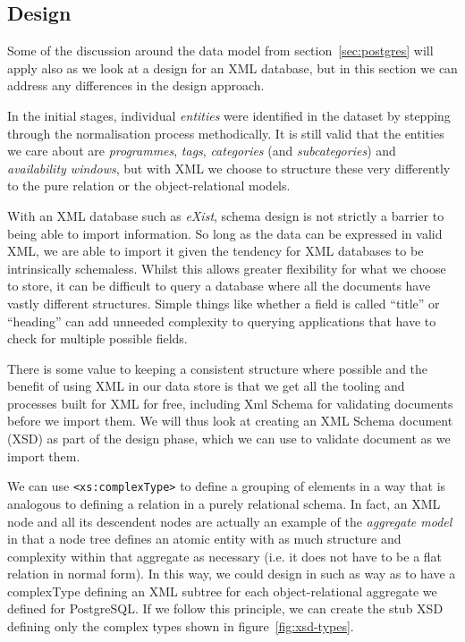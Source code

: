 \documentclass[11pt,a4paper]{article}
\begin{document}
\subsection{Design}

Some of the discussion around the data model from section~\ref{sec:postgres}
will apply also as we look at a design for an XML database, but
in this section we can address any differences in the design approach.

In the initial stages, individual \emph{entities} were identified in the
dataset by stepping through the normalisation process methodically. It
is still valid that the entities we care about are \emph{programmes},
\emph{tags}, \emph{categories} (and \emph{subcategories}) and
\emph{availability windows}, but with XML we choose to structure these
very differently to the pure relation or the object-relational models.

With an XML database such as \emph{eXist}, schema design is not strictly
a barrier to being able to import information. So long as the data can
be expressed in valid XML, we are able to import it given the tendency
for XML databases to be intrinsically schemaless. Whilst this allows
greater flexibility for what we choose to store, it can be difficult
to query a database where all the documents have vastly different structures.
Simple things like whether a field is called ``title'' or ``heading''
can add unneeded complexity to querying applications that have to check
for multiple possible fields.

There is some value to keeping a consistent structure where possible
and the benefit of using XML in our data store is that we get all
the tooling and processes built for XML for free, including Xml Schema for
validating documents before we import them. We will thus look at creating
an XML Schema document (XSD) as part of the design phase, which we can
use to validate document as we import them.

We can use \lstinline|<xs:complexType>| to define a grouping of elements
in a way that is analogous to defining a relation in a purely relational
schema. In fact, an XML node and all its descendent nodes are actually an
example of the \emph{aggregate model} in that a node tree defines an
atomic entity with as much structure and complexity within that
aggregate as necessary (i.e. it does not have to be a flat relation in
normal form). In this way, we could design in such as way as to have
a complexType defining an XML subtree for each object-relational aggregate
we defined for PostgreSQL. If we follow this principle, we can create
the stub XSD defining only the complex types shown in
figure~\ref{fig:xsd-types}.
\end{document}
